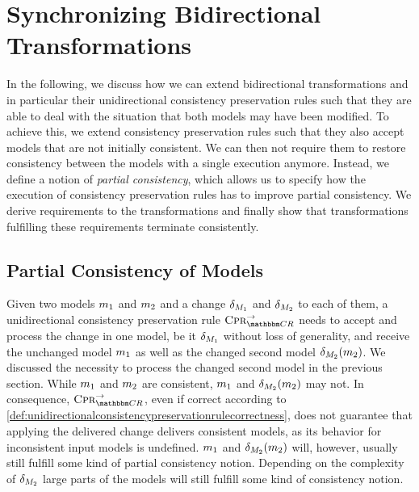 \section{Synchronizing Bidirectional Transformations}

In the following, we discuss how we can extend bidirectional transformations and in particular their unidirectional consistency preservation rules such that they are able to deal with the situation that both models may have been modified.
To achieve this, we extend consistency preservation rules such that they also accept models that are not initially consistent.
We can then not require them to restore consistency between the models with a single execution anymore.
Instead, we define a notion of \emph{partial consistency}, which allows us to specify how the execution of consistency preservation rules has to improve partial consistency.
We derive requirements to the transformations and finally show that transformations fulfilling these requirements terminate consistently.


\subsection{Partial Consistency of Models}

Given two models $m_{1}$ and $m_{2}$ and a change $\delta_{M_{1}}$ and $\delta_{M_{2}}$ to each of them, a unidirectional consistency preservation rule $\consistencypreservationrule{\consistencyrelationset{CR}}^{\rightarrow}$ needs to accept and process the change in one model, be it $\delta_{M_{1}}$ without loss of generality, and receive the unchanged model $m_{1}$ as well as the changed second model $\delta_{M_{2}}(m_{2})$.
We discussed the necessity to process the changed second model in the previous section.
While $m_{1}$ and $m_{2}$ are consistent, $m_{1}$ and $\delta_{M_{2}}(m_{2})$ may not.
In consequence, $\consistencypreservationrule{\consistencyrelationset{CR}}^{\rightarrow}$, even if correct according to \autoref{def:unidirectionalconsistencypreservationrulecorrectness}, does not guarantee that applying the delivered change delivers consistent models, as its behavior for inconsistent input models is undefined.
$m_{1}$ and $\delta_{M_{2}}(m_{2})$ will, however, usually still fulfill some kind of partial consistency notion.
Depending on the complexity of $\delta_{M_{2}}$ large parts of the models will still fulfill some kind of consistency notion.

